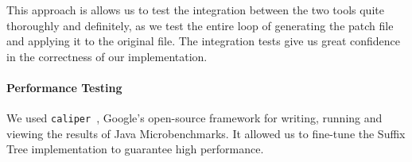 This approach is allows us to test the integration between the two tools quite thoroughly and definitely, as we test the entire loop of generating the patch file and applying it to the original file. The integration tests give us great confidence in the correctness of our implementation.

\paragraph{Performance Testing}
We used \texttt{caliper}~\cite{caliper}, Google's open-source framework for writing, running and viewing the results of Java Microbenchmarks. It allowed us to fine-tune the Suffix Tree implementation to guarantee high performance.
